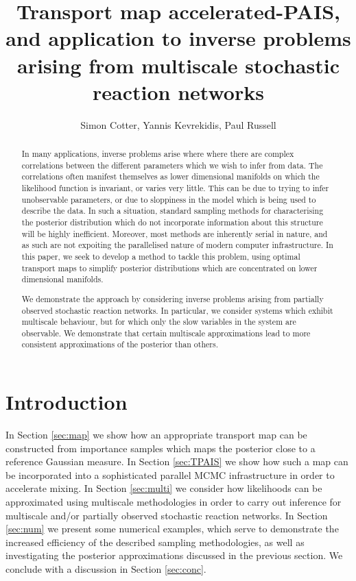 \documentclass[final]{siamltex}
\title{Transport map accelerated-PAIS, and application to inverse problems arising from
  multiscale stochastic reaction networks}
\author{Simon Cotter, Yannis Kevrekidis, Paul Russell}
\begin{document}
\maketitle
\begin{abstract}
In many applications, inverse problems arise where where there are
complex correlations between the different parameters which we wish to
infer from data. The correlations often manifest themselves as lower
dimensional manifolds on which the likelihood function is
invariant, or varies very little. This can be due to trying to infer
unobservable parameters, or due to sloppiness in the model which is
being used to describe the data. In such a situation, standard
sampling methods for characterising the posterior distribution which
do not incorporate information about this structure will be highly
inefficient. Moreover, most methods are inherently serial in nature,
and as such are not expoiting the parallelised  nature of modern
computer infrastructure. In this paper, we seek to develop a method to
tackle this problem, using optimal transport maps to simplify
posterior distributions which are concentrated on lower dimensional
manifolds.

We demonstrate the approach by considering inverse problems arising
from partially observed stochastic reaction networks. In particular,
we consider systems which exhibit multiscale behaviour, but for which
only the slow variables in the system are observable. We demonstrate
that certain multiscale approximations lead to more consistent
approximations of the posterior than others.
\end{abstract}


\section{Introduction}

In Section \ref{sec:map} we show how an appropriate transport map can
be constructed from importance samples which maps the posterior close
to a reference Gaussian measure. In Section \ref{sec:TPAIS} we show
how such a map can be incorporated into a sophisticated parallel MCMC
infrastructure in order to accelerate mixing. In Section
\ref{sec:multi} we consider how likelihoods can be approximated using
multiscale methodologies in order to carry out inference for
multiscale and/or partially observed stochastic reaction networks. In
Section \ref{sec:num} we present some numerical examples, which serve
to demonstrate the increased efficiency of the described sampling
methodologies, as well as investigating the posterior approximations
discussed in the previous section. We conclude with a discussion in
Section \ref{sec:conc}.
\end{document}
